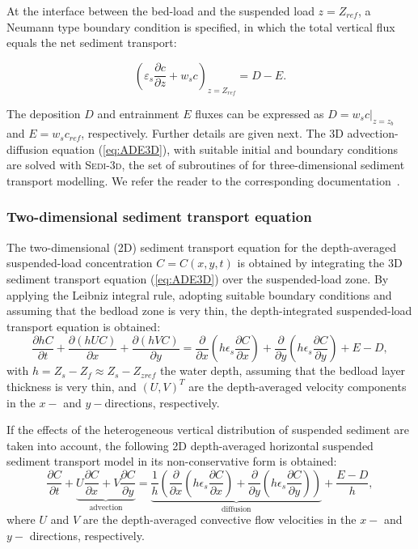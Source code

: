 At the interface between the bed-load and the suspended load $z=Z_{ref}$, a Neumann type boundary condition is specified, in which the total vertical flux equals the net sediment transport:

\begin{equation*}
\left(\varepsilon_s\frac{\partial c}{\partial z} + w_sc\right)_{z=Z_{ref}} = D-E.
\end{equation*}

The deposition $D$ and entrainment $E$ fluxes can be expressed as $D=w_s c|_{z=z_b}$ and $E=w_s c_{ref}$, respectively. Further details are given next. The 3D advection-diffusion equation (\ref{eq:ADE3D}), with suitable initial and boundary conditions are solved with {\scshape Sedi-3d}, the set of subroutines of \telddd for three-dimensional sediment transport modelling. We refer the reader to the corresponding documentation~\cite{sedi3d}.   

\subsubsection{Two-dimensional sediment transport equation}
The two-dimensional (2D) sediment transport equation for the depth-averaged suspended-load concentration $C=C(x,y,t)$ is
obtained by integrating the 3D sediment transport equation (\ref{eq:ADE3D}) over the suspended-load zone. By applying the Leibniz integral rule, adopting suitable boundary conditions and assuming that the bedload zone is very thin, the depth-integrated suspended-load transport equation is obtained:
\begin{equation}\label{eq:ADE2D}
\frac{\partial hC}{\partial t} + \frac{\partial (hUC)}{\partial x} +
\frac{\partial (hVC)}{\partial y} = 
\frac{\partial }{\partial x} \left(h\epsilon_s\frac{\partial C}{\partial x}\right) + 
\frac{\partial }{\partial y} \left(h\epsilon_s\frac{\partial C}{\partial y}\right) + E - D,
\end{equation}
with $h=Z_s-Z_f \approx Z_s-Z_{zref}$ the water depth, assuming that the bedload layer thickness is very thin, and $(U,V)^T$ are the depth-averaged velocity components in the $x-$ and $y-$directions, respectively. 

If the effects of the heterogeneous vertical distribution of suspended sediment are taken into account, the following 2D depth-averaged horizontal suspended sediment transport model in its non-conservative form is obtained:
\begin{equation}\label{eq:ADE2DNC}
\frac{\partial C}{\partial t} + \underbrace{
U \frac{\partial C}{\partial x} + 
V \frac{\partial C}{\partial y}}_{\text{advection}} = 
\underbrace{\frac{1}{h} \left(\frac{\partial }{\partial x} \left( h\epsilon_s \frac{\partial C}{\partial x} \right) + 
\frac{\partial }{\partial y} \left(h\epsilon_s \frac{\partial C}{\partial y} \right) \right)}_{\text{diffusion}} +
\frac{E-D}{h}, 
\end{equation}
where $U$ and $V$ are the depth-averaged convective flow velocities in the $x-$ and $y-$ directions, respectively.

